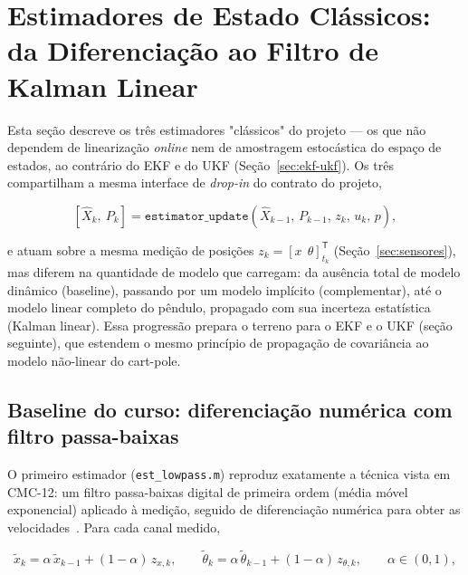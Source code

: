 \documentclass[brazil, 12pt]{article}
\begin{document}
\section{Estimadores de Estado Clássicos: da Diferenciação ao Filtro de Kalman Linear}
\label{sec:estimadores-classicos}

Esta seção descreve os três estimadores "clássicos" do projeto --- os que não
dependem de linearização \emph{online} nem de amostragem estocástica do espaço
de estados, ao contrário do EKF e do UKF (Seção~\ref{sec:ekf-ukf}). Os três
compartilham a mesma interface de \emph{drop-in} do contrato do projeto,

\[
[\hat X_k,\ P_k] = \texttt{estimator\_update}(\hat X_{k-1},\, P_{k-1},\, z_k,\, u_k,\, p),
\]

e atuam sobre a mesma medição de posições $z_k=[x\ \ \theta]^{\mathsf T}_{t_k}$
(Seção~\ref{sec:sensores}), mas diferem na quantidade de modelo que carregam:
da ausência total de modelo dinâmico (baseline), passando por um modelo
implícito (complementar), até o modelo linear completo do pêndulo, propagado
com sua incerteza estatística (Kalman linear). Essa progressão prepara o
terreno para o EKF e o UKF (seção seguinte), que estendem o mesmo princípio de
propagação de covariância ao modelo não-linear do cart-pole.

\subsection{Baseline do curso: diferenciação numérica com filtro passa-baixas}
\label{sec:baseline-lowpass}

O primeiro estimador (\texttt{est\_lowpass.m}) reproduz exatamente a técnica
vista em CMC-12: um filtro passa-baixas digital de primeira ordem (média móvel
exponencial) aplicado à medição, seguido de diferenciação numérica para obter as
velocidades~\cite{oppenheim}. Para cada canal medido,

\[
\tilde x_k = \alpha\,\tilde x_{k-1} + (1-\alpha)\,z_{x,k},
\qquad
\tilde\theta_k = \alpha\,\tilde\theta_{k-1} + (1-\alpha)\,z_{\theta,k},
\qquad \alpha\in(0,1),
\]
\end{document}
